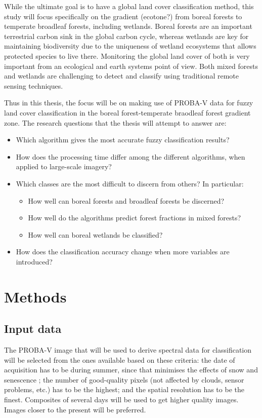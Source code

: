 \documentclass[a4paper,10pt]{article}
\begin{document}
While the ultimate goal is to have a global land cover classification method, this study will focus specifically on the gradient \textcolor{black!50}{(ecotone?)} from boreal forests to temperate broadleaf forests, including wetlands. Boreal forests are an important terrestrial carbon sink in the global carbon cycle, whereas wetlands are key for maintaining biodiversity due to the uniqueness of wetland ecosystems that allows protected species to live there. Monitoring the global land cover of both is very important from an ecological and earth systems point of view. Both mixed forests and wetlands are challenging to detect and classify using traditional remote sensing techniques.

Thus in this thesis, the focus will be on making use of PROBA-V data for fuzzy land cover classification in the boreal forest-temperate braodleaf forest gradient zone. The research questions that the thesis will attempt to answer are:

\begin{itemize}
 \item Which algorithm gives the most accurate fuzzy classification results?
 \item How does the processing time differ among the different algorithms, when applied to large-scale imagery?
 \item Which classes are the most difficult to discern from others? In particular: 
 \begin{itemize}
  \item How well can boreal forests and broadleaf forests be discerned?
  \item How well do the algorithms predict forest fractions in mixed forests?
  \item How well can boreal wetlands be classified?
 \end{itemize}
 \item How does the classification accuracy change when more variables are introduced?
\end{itemize}

\section{Methods}

\subsection{Input data}

The PROBA-V image that will be used to derive spectral data for classification will be selected from the ones available based on these criteria: the date of acquisition has to be during summer, since that minimises the effects of snow and senescence \cite{bartalev2014probavboreal}; the number of good-quality pixels (not affected by clouds, sensor problems, etc.) has to be the highest; and the spatial resolution has to be the finest. Composites of several days will be used to get higher quality images. Images closer to the present will be preferred.
\end{document}
